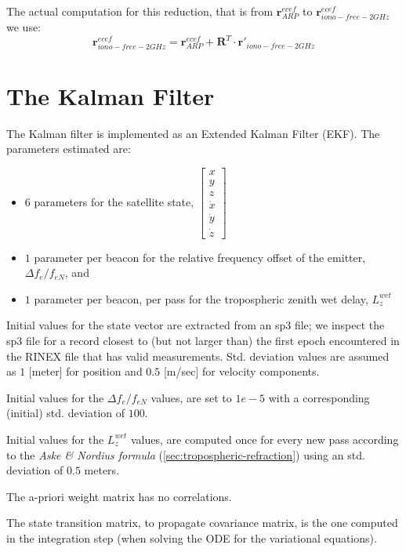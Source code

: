 The actual computation for this reduction, that is from $\bm{r}_{ARP}^{ecef}$ 
to $\bm{r}_{iono-free-2GHz}^{ecef}$ we use:
\begin{equation}
  \bm{r}_{iono-free-2GHz}^{ecef} = \bm{r}_{ARP}^{ecef} + \bm{R}^T \cdot \bm{r}'_{iono-free-2GHz}
\end{equation}

\section{The Kalman Filter}
\label{sec:the-kalman-filter}
The Kalman filter is implemented as an  Extended Kalman Filter (EKF). The parameters 
estimated are:
\begin{itemize} 
  \item $6$ parameters for the satellite state, $\begin{bmatrix} x\\ y\\ z\\ \dot{x}\\ \dot{y}\\ \dot{z}\end{bmatrix}$
  \item $1$ parameter per beacon for the relative frequency offset of the emitter, $\Delta f_{e} / f_{eN}$, and
  \item $1$ parameter per beacon, per pass for the tropospheric zenith wet delay, $L_{z}^{wet}$
\end{itemize}

Initial values for the state vector are extracted from an sp3 file; we inspect 
the sp3 file for a record closest to (but not larger than) the first epoch 
encountered in the RINEX file that has valid measurements. Std. deviation values 
are assumed as $1$ [meter] for position and $0.5$ [m/sec] for velocity components.

Initial values for the $\Delta f_{e} / f_{eN}$ values, are set to $1e-5$ with a 
corresponding (initial) std. deviation of $100$.

Initial values for the $L_{z}^{wet}$ values, are computed once for every new 
pass according to the \textit{Aske \& Nordius formula} (\ref{sec:tropospheric-refraction}) 
using an std. deviation of $0.5$ meters.

The a-priori weight matrix has no correlations.

The state transition matrix, to propagate covariance matrix, is the one 
computed in the integration step (when solving the ODE for the variational 
equations).


